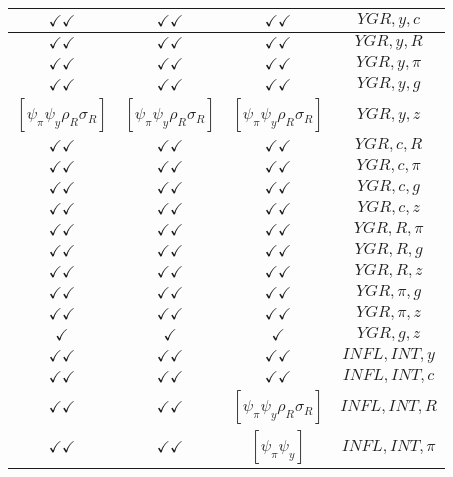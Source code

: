 \documentclass[a4paper,10pt]{article}
\begin{document}
\begin{longtable}{|c|c|c|c|}
\hline
$\checkmark\checkmark$ & $\checkmark\checkmark$ & $\checkmark\checkmark$ & ${YGR},{y},{c}$ \\
\hline
$\checkmark\checkmark$ & $\checkmark\checkmark$ & $\checkmark\checkmark$ & ${YGR},{y},{R}$ \\
\hline
$\checkmark\checkmark$ & $\checkmark\checkmark$ & $\checkmark\checkmark$ & ${YGR},{y},{\pi}$ \\
\hline
$\checkmark\checkmark$ & $\checkmark\checkmark$ & $\checkmark\checkmark$ & ${YGR},{y},{g}$ \\
\hline
$[\psi_\pi \psi_y \rho_R \sigma_R ]$ & $[\psi_\pi \psi_y \rho_R \sigma_R ]$ & $[\psi_\pi \psi_y \rho_R \sigma_R ]$ & ${YGR},{y},{z}$ \\
\hline
$\checkmark\checkmark$ & $\checkmark\checkmark$ & $\checkmark\checkmark$ & ${YGR},{c},{R}$ \\
\hline
$\checkmark\checkmark$ & $\checkmark\checkmark$ & $\checkmark\checkmark$ & ${YGR},{c},{\pi}$ \\
\hline
$\checkmark\checkmark$ & $\checkmark\checkmark$ & $\checkmark\checkmark$ & ${YGR},{c},{g}$ \\
\hline
$\checkmark\checkmark$ & $\checkmark\checkmark$ & $\checkmark\checkmark$ & ${YGR},{c},{z}$ \\
\hline
$\checkmark\checkmark$ & $\checkmark\checkmark$ & $\checkmark\checkmark$ & ${YGR},{R},{\pi}$ \\
\hline
$\checkmark\checkmark$ & $\checkmark\checkmark$ & $\checkmark\checkmark$ & ${YGR},{R},{g}$ \\
\hline
$\checkmark\checkmark$ & $\checkmark\checkmark$ & $\checkmark\checkmark$ & ${YGR},{R},{z}$ \\
\hline
$\checkmark\checkmark$ & $\checkmark\checkmark$ & $\checkmark\checkmark$ & ${YGR},{\pi},{g}$ \\
\hline
$\checkmark\checkmark$ & $\checkmark\checkmark$ & $\checkmark\checkmark$ & ${YGR},{\pi},{z}$ \\
\hline
$\checkmark$ & $\checkmark$ & $\checkmark$ & ${YGR},{g},{z}$ \\
\hline
$\checkmark\checkmark$ & $\checkmark\checkmark$ & $\checkmark\checkmark$ & ${INFL},{INT},{y}$ \\
\hline
$\checkmark\checkmark$ & $\checkmark\checkmark$ & $\checkmark\checkmark$ & ${INFL},{INT},{c}$ \\
\hline
$\checkmark\checkmark$ & $\checkmark\checkmark$ & $[\psi_\pi \psi_y \rho_R \sigma_R ]$ & ${INFL},{INT},{R}$ \\
\hline
$\checkmark\checkmark$ & $\checkmark\checkmark$ & $[\psi_\pi \psi_y ]$ & ${INFL},{INT},{\pi}$ \\

\end{longtable}
\end{document}
